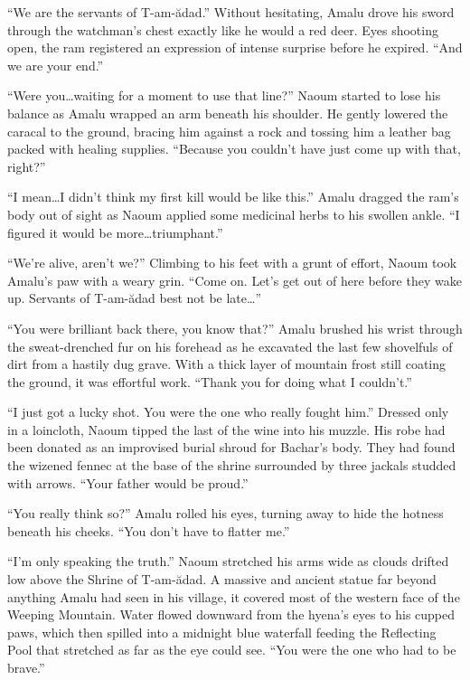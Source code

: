 ``We are the servants of T-am-ădad.'' Without hesitating, Amalu drove his sword through the watchman's chest exactly like he would a red deer. Eyes shooting open, the ram registered an expression of intense surprise before he expired. ``And we are your end.''

``Were you\ldots{}waiting for a moment to use that line?'' Naoum started to lose his balance as Amalu wrapped an arm beneath his shoulder. He gently lowered the caracal to the ground, bracing him against a rock and tossing him a leather bag packed with healing supplies. ``Because you couldn't have just come up with that, right?''

``I mean\ldots{}I didn't think my first kill would be like this.'' Amalu dragged the ram's body out of sight as Naoum applied some medicinal herbs to his swollen ankle. ``I figured it would be more\ldots{}triumphant.''

``We're alive, aren't we?'' Climbing to his feet with a grunt of effort, Naoum took Amalu's paw with a weary grin. ``Come on. Let's get out of here before they wake up. Servants of T-am-ădad best not be late\ldots''

\secdiv

\noindent ``You were brilliant back there, you know that?'' Amalu brushed his wrist through the sweat-drenched fur on his forehead as he excavated the last few shovelfuls of dirt from a hastily dug grave. With a thick layer of mountain frost still coating the ground, it was effortful work. ``Thank you for doing what I couldn't.''

``I just got a lucky shot. You were the one who really fought him.'' Dressed only in a loincloth, Naoum tipped the last of the wine into his muzzle. His robe had been donated as an improvised burial shroud for Bachar's body. They had found the wizened fennec at the base of the shrine surrounded by three jackals studded with arrows. ``Your father would be proud.''

``You really think so?'' Amalu rolled his eyes, turning away to hide the hotness beneath his cheeks. ``You don't have to flatter me.''

``I'm only speaking the truth.'' Naoum stretched his arms wide as clouds drifted low above the Shrine of T-am-ădad. A massive and ancient statue far beyond anything Amalu had seen in his village, it covered most of the western face of the Weeping Mountain. Water flowed downward from the hyena's eyes to his cupped paws, which then spilled into a midnight blue waterfall feeding the Reflecting Pool that stretched as far as the eye could see. ``You were the one who had to be brave.''

